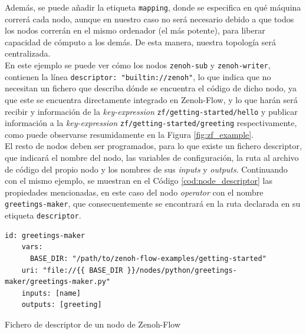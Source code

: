 Además, se puede añadir la etiqueta \verb|mapping|, donde se especifica en qué
máquina correrá cada nodo, aunque en nuestro caso no será necesario debido a que
todos los nodos correrán en el mismo ordenador (el más potente), para liberar
capacidad de cómputo a los demás.
De esta manera, nuestra topología será centralizada.
\\

En este ejemplo se puede ver cómo los nodos \verb|zenoh-sub| y
\verb|zenoh-writer|, contienen la línea \verb|descriptor: "builtin://zenoh"|, lo
que indica que no necesitan un fichero que describa dónde se encuentra el código
de dicho nodo, ya que este se encuentra directamente integrado en Zenoh-Flow, y
lo que harán será recibir y información de la \textit{key-expression}
\verb|zf/getting-started/hello| y publicar información a la
\textit{key-expression} \verb|zf/getting-started/greeting| respectivamente, como
puede observarse resumidamente en la Figura \ref{fig:zf_example}.
\\

El resto de nodos deben ser programados, para lo que existe un fichero
descriptor, que indicará el nombre del nodo, las variables de configuración, la
ruta al archivo de código del propio nodo y los nombres de sus \textit{inputs} y
\textit{outputs}.
Continuando con el mismo ejemplo, se muestran en el Código
\ref{cod:node_descriptor} las propiedades mencionadas, en este caso del nodo
\textit{operator} con el nombre \verb|greetings-maker|, que consecuentemente se
encontrará en la ruta declarada en su etiqueta \verb|descriptor|.
\\

\begin{code}[H]
  \begin{lstlisting}[style=yaml]
    id: greetings-maker
    vars:
      BASE_DIR: "/path/to/zenoh-flow-examples/getting-started"
    uri: "file://{{ BASE_DIR }}/nodes/python/greetings-maker/greetings-maker.py"
    inputs: [name]
    outputs: [greeting]
  \end{lstlisting}
\caption[Fichero de descriptor de un nodo de Zenoh-Flow]{Fichero de descriptor de un nodo de Zenoh-Flow}
\label{cod:node_descriptor}
\end{code}


